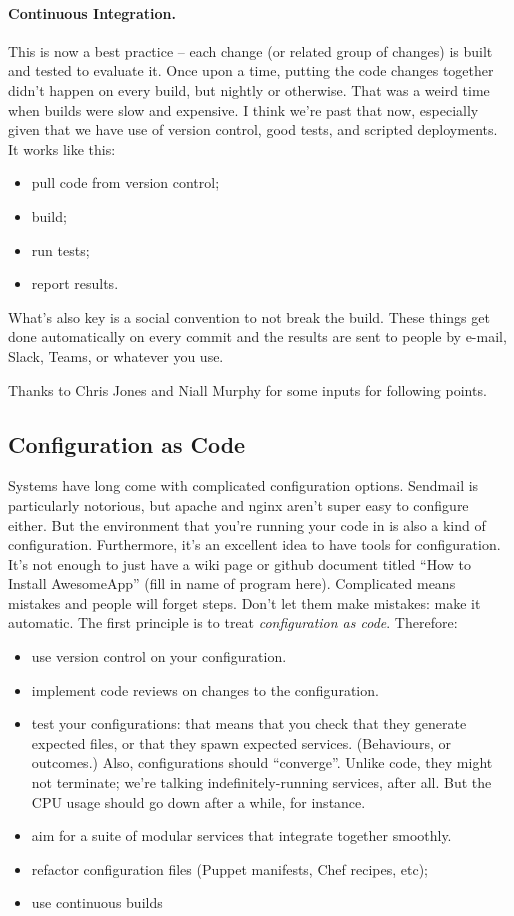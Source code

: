 \documentclass[a4paper]{report}
\begin{document}
\paragraph{Continuous Integration.} 
This is now a best practice -- each change (or related group of changes) is built and tested to evaluate it. Once upon a time, putting the code changes together didn't happen on every build, but nightly or otherwise. That was a weird time when builds were slow and expensive. I think we're past that now, especially given that we have use of version control, good tests, and scripted deployments.
It works like this:
\begin{itemize}
\item pull code from version control;
\item build;
\item run tests;
\item report results.
\end{itemize}
What's also key is a social convention to not break the build. These things get done automatically on every commit and the results are sent to people by e-mail, Slack, Teams, or whatever you use. 

Thanks to Chris Jones and Niall Murphy for some inputs for following points.

\subsection*{Configuration as Code}
Systems have long come with complicated configuration options. 
Sendmail is particularly notorious, but apache and nginx aren't super
easy to configure either. But the environment that you're running your code in is also a kind of configuration. Furthermore, it's an excellent idea to have tools for configuration. It's not enough to just have a wiki page or github document titled ``How to Install AwesomeApp'' (fill in name of program here). Complicated means mistakes and people will forget steps. Don't let them make mistakes: make it automatic. The first principle is to treat \emph{configuration as code}. 
Therefore:
\begin{itemize}
\item use version control on your configuration.
\item implement code reviews on changes to the configuration.
\item test your configurations: that means that you check that they
  generate expected files, or that they spawn expected
  services. (Behaviours, or outcomes.) Also, configurations should
  ``converge''. Unlike code, they might not terminate; we're talking
  indefinitely-running services, after all. But the CPU usage should
  go down after a while, for instance.
\item aim for a suite of modular services that integrate together smoothly.
\item refactor configuration files (Puppet manifests, Chef recipes, etc);
\item use continuous builds
\end{itemize}
\end{document}

